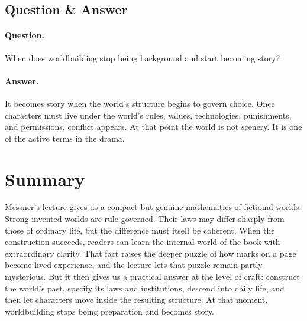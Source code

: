 \subsection{Question \& Answer}

\paragraph{Question.} When does worldbuilding stop being background and start becoming story?

\paragraph{Answer.} It becomes story when the world's structure begins to govern choice. Once characters must live under the world's rules, values, technologies, punishments, and permissions, conflict appears. At that point the world is not scenery. It is one of the active terms in the drama.

\section{Summary}

Messner's lecture gives us a compact but genuine mathematics of fictional worlds. Strong invented worlds are rule-governed. Their laws may differ sharply from those of ordinary life, but the difference must itself be coherent. When the construction succeeds, readers can learn the internal world of the book with extraordinary clarity. That fact raises the deeper puzzle of how marks on a page become lived experience, and the lecture lets that puzzle remain partly mysterious. But it then gives us a practical answer at the level of craft: construct the world's past, specify its laws and institutions, descend into daily life, and then let characters move inside the resulting structure. At that moment, worldbuilding stops being preparation and becomes story.